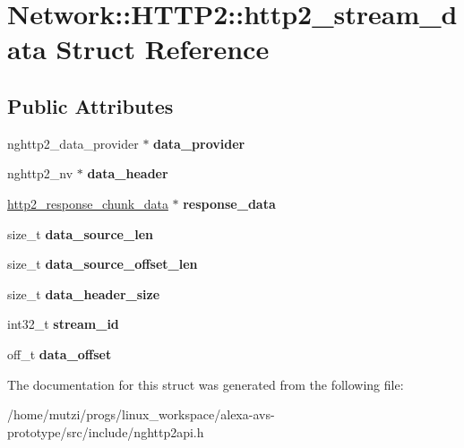 \hypertarget{structNetwork_1_1HTTP2_1_1http2__stream__data}{}\section{Network\+:\+:H\+T\+T\+P2\+:\+:http2\+\_\+stream\+\_\+data Struct Reference}
\label{structNetwork_1_1HTTP2_1_1http2__stream__data}
\subsection*{Public Attributes}
\begin{DoxyCompactItemize}
\item 
\mbox{\label{structNetwork_1_1HTTP2_1_1http2__stream__data_a6631efee322d9a8ad9b900cf219da1fc}} 
nghttp2\+\_\+data\+\_\+provider $\ast$ {\bfseries data\+\_\+provider}
\item 
\mbox{\label{structNetwork_1_1HTTP2_1_1http2__stream__data_ae2751d4e18224a1fff8da1d63bc24381}} 
nghttp2\+\_\+nv $\ast$ {\bfseries data\+\_\+header}
\item 
\mbox{\label{structNetwork_1_1HTTP2_1_1http2__stream__data_a325aa00a6a6d7518ce1c29d1cef59b3f}} 
\hyperlink{structNetwork_1_1HTTP2_1_1http2__response__chunk__data}{http2\+\_\+response\+\_\+chunk\+\_\+data} $\ast$ {\bfseries response\+\_\+data}
\item 
\mbox{\label{structNetwork_1_1HTTP2_1_1http2__stream__data_ade146566004494b23c0dcc7cbba6def7}} 
size\+\_\+t {\bfseries data\+\_\+source\+\_\+len}
\item 
\mbox{\label{structNetwork_1_1HTTP2_1_1http2__stream__data_a3762540bdc2fb47ab7e64d5951f9b4ea}} 
size\+\_\+t {\bfseries data\+\_\+source\+\_\+offset\+\_\+len}
\item 
\mbox{\label{structNetwork_1_1HTTP2_1_1http2__stream__data_a273fea446302d2cf53967113c87a824a}} 
size\+\_\+t {\bfseries data\+\_\+header\+\_\+size}
\item 
\mbox{\label{structNetwork_1_1HTTP2_1_1http2__stream__data_a4ab58c52bd33e1ceac44c4cc590420a8}} 
int32\+\_\+t {\bfseries stream\+\_\+id}
\item 
\mbox{\label{structNetwork_1_1HTTP2_1_1http2__stream__data_a70eaa99698690a9d436dc1d79f580fbc}} 
off\+\_\+t {\bfseries data\+\_\+offset}
\end{DoxyCompactItemize}


The documentation for this struct was generated from the following file\+:\begin{DoxyCompactItemize}
\item 
/home/mutzi/progs/linux\+\_\+workspace/alexa-\/avs-\/prototype/src/include/nghttp2api.\+h\end{DoxyCompactItemize}
